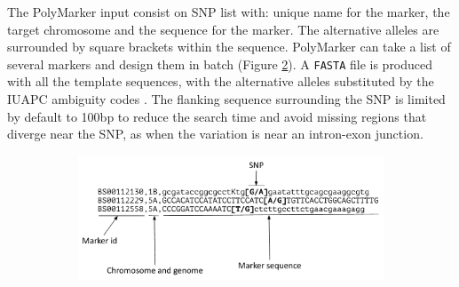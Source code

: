 The PolyMarker input consist on SNP list with: unique name for the marker, the target chromosome and the sequence for the marker. 
The alternative alleles are surrounded by square brackets within the sequence. PolyMarker can take a list of several markers and design them in batch (Figure \ref{fig:poly:input}). 
A \verb|FASTA| file is produced with all the template sequences, with the alternative alleles substituted by the IUAPC ambiguity codes \citep{Cornish-Bowden1985}. 
The flanking sequence surrounding the SNP is limited by default to 100bp to reduce the search time and avoid missing regions that diverge near the SNP, as when the variation is near an intron-exon junction. 

\begin{figure}
    \centering
    \begin{subfigure}[b]{0.8\textwidth}
        \caption{}
        \includegraphics[width=1\textwidth]{PolyMarker/Figures/aln/input.pdf} 
        \label{fig:poly:input}
    \end{subfigure}


\end{figure}
